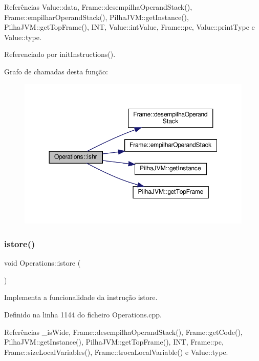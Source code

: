 Referências Value\+::data, Frame\+::desempilha\+Operand\+Stack(), Frame\+::empilhar\+Operand\+Stack(), Pilha\+J\+V\+M\+::get\+Instance(), Pilha\+J\+V\+M\+::get\+Top\+Frame(), I\+NT, Value\+::int\+Value, Frame\+::pc, Value\+::print\+Type e Value\+::type.



Referenciado por init\+Instructions().

Grafo de chamadas desta função\+:
\nopagebreak
\begin{figure}[H]
\begin{center}
\leavevmode
\includegraphics[width=350pt]{classOperations_aa67d92582121939b307658d417b34d3c_cgraph}
\end{center}
\end{figure}
\mbox{\label{classOperations_a1547cbd0fa84e551f218d472a5187efa}} 
\subsubsection{\texorpdfstring{istore()}{istore()}}
{\footnotesize\ttfamily void Operations\+::istore (\begin{DoxyParamCaption}{ }\end{DoxyParamCaption})\hspace{0.3cm}{\ttfamily [private]}}



Implementa a funcionalidade da instrução istore. 



Definido na linha 1144 do ficheiro Operations.\+cpp.



Referências \+\_\+is\+Wide, Frame\+::desempilha\+Operand\+Stack(), Frame\+::get\+Code(), Pilha\+J\+V\+M\+::get\+Instance(), Pilha\+J\+V\+M\+::get\+Top\+Frame(), I\+NT, Frame\+::pc, Frame\+::size\+Local\+Variables(), Frame\+::troca\+Local\+Variable() e Value\+::type.



